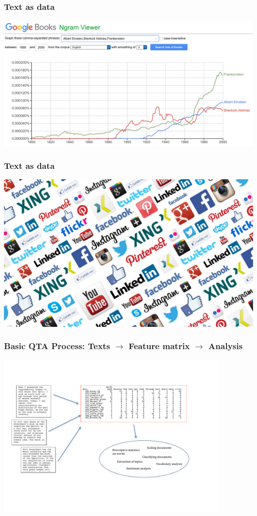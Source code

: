 \documentclass[notes=hide]{beamer}
\begin{document}
	

  


\begin{frame}
	\frametitle{Text as data}
	\includegraphics[width=1\linewidth]{figures/motivation3.png}
\end{frame}

\begin{frame}
	\frametitle{Text as data}
	\includegraphics[width=1\linewidth]{figures/motivation4.jpg}
\end{frame}

\begin{frame}
	\frametitle{Basic QTA Process: Texts $\rightarrow$ Feature matrix $\rightarrow$ Analysis}
	\includegraphics[width=11.5cm]{figures/workflow.pdf}
\end{frame}
\end{document}

